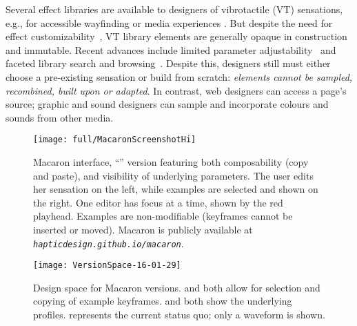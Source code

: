 Several effect libraries are available to designers of vibrotactile (VT) sensations, e.g., for accessible wayfinding \cite{Zelek2003} or %
media experiences \cite{SchneiderAsiaHaptics2014,Israr2014,ImmersionCorporation,Culbertson2014}. 
But despite the need for effect customizability~\cite{Seifi2014}, VT library elements are generally opaque in construction and immutable.
Recent advances include limited parameter adjustability~\cite{Israr2014,SchneiderAsiaHaptics2014} and faceted library search and browsing~\cite{Seifi2015}. 
Despite this, designers still must either choose a pre-existing sensation or build from scratch:
\textit{elements cannot be sampled, recombined, built upon or adapted}. %
In contrast, web designers can access a page's source;
graphic and sound designers can sample and incorporate colours and sounds from other media.

\begin{figure}
        \centering
        \texttt{[image: full/MacaronScreenshotHi]}
        \caption{Macaron interface, ``\hi'' version featuring both composability (copy and paste), and visibility of underlying parameters. The user edits her sensation on the left, while examples are selected and shown on the right. One editor has focus at a time, shown by the red playhead. Examples are non-modifiable (keyframes cannot be inserted or moved).
        Macaron is publicly available at \emph{{\tt hapticdesign.github.io/macaron}}.
}
        \label{fig:macaron:hi}
\end{figure}


\begin{figure}[tb]
    \centering
    \texttt{[image: VersionSpace-16-01-29]}
    \caption{Design space for Macaron versions. \hi and \select both allow for selection and copying of example keyframes. \vis and \hi both show the underlying profiles. \lo represents the current status quo; only a waveform is shown.
    }
    \label{fig:versions}
\end{figure}


